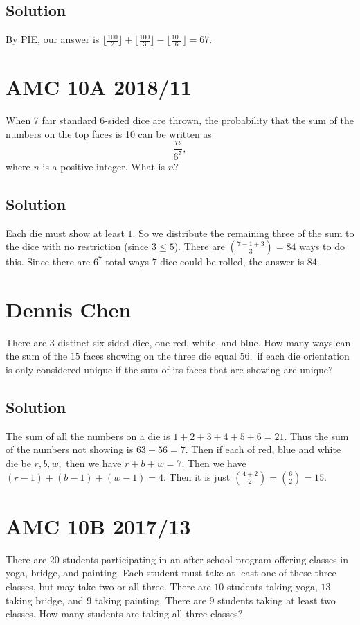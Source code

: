 \documentclass[blue,onecol]{shooting}
\begin{document}
\subsection{Solution}
By PIE, our answer is $\lfloor\frac{100}{2}\rfloor+\lfloor\frac{100}{3}\rfloor-\lfloor\frac{100}{6}\rfloor=67.$

\section{AMC 10A 2018/11}
When 7 fair standard 6-sided dice are thrown, the probability that the sum of the numbers on the top faces is 10 can be written as\[\frac{n}{6^7},\]where $n$ is a positive integer. What is $n$?

\subsection{Solution}
Each die must show at least $1.$ So we distribute the remaining three of the sum to the dice with no restriction (since $3\leq 5$). There are $\binom{7-1+3}{3}=84$ ways to do this. Since there are $6^7$ total ways $7$ dice could be rolled, the answer is $84.$

\section{Dennis Chen}
There are $3$ distinct six-sided dice, one red, white, and blue. How many ways can the sum of the $15$ faces showing on the three die equal $56,$ if each die orientation is only considered unique if the sum of its faces that are showing are unique?

\subsection{Solution}
The sum of all the numbers on a die is $1+2+3+4+5+6=21.$ Thus the sum of the numbers not showing is $63-56=7.$ Then if each of red, blue and white die be $r, b, w,$ then we have $r+b+w=7.$ Then we have $(r-1)+(b-1)+(w-1)=4$. Then it is just $\binom{4+2}{2} = \binom{6}{2} = 15.$  

\section{AMC 10B 2017/13}
There are $20$ students participating in an after-school program offering classes in yoga, bridge, and painting. Each student must take at least one of these three classes, but may take two or all three. There are $10$ students taking yoga, $13$ taking bridge, and $9$ taking painting. There are $9$ students taking at least two classes. How many students are taking all three classes?
\end{document}
